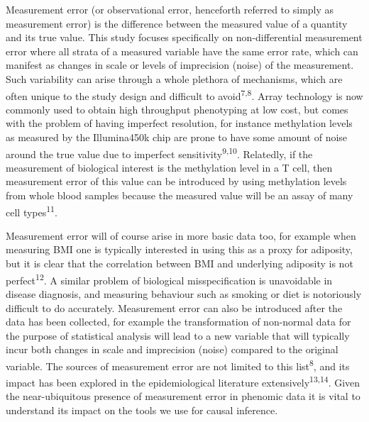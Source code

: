 \documentclass[]{article}
\begin{document}
Measurement error (or observational error, henceforth referred to simply
as measurement error) is the difference between the measured value of a
quantity and its true value. This study focuses specifically on
non-differential measurement error where all strata of a measured
variable have the same error rate, which can manifest as changes in
scale or levels of imprecision (noise) of the measurement. Such
variability can arise through a whole plethora of mechanisms, which are
often unique to the study design and difficult to
avoid\textsuperscript{7,8}. Array technology is now commonly used to
obtain high throughput phenotyping at low cost, but comes with the
problem of having imperfect resolution, for instance methylation levels
as measured by the Illumina450k chip are prone to have some amount of
noise around the true value due to imperfect
sensitivity\textsuperscript{9,10}. Relatedly, if the measurement of
biological interest is the methylation level in a T cell, then
measurement error of this value can be introduced by using methylation
levels from whole blood samples because the measured value will be an
assay of many cell types\textsuperscript{11}.

Measurement error will of course arise in more basic data too, for
example when measuring BMI one is typically interested in using this as
a proxy for adiposity, but it is clear that the correlation between BMI
and underlying adiposity is not perfect\textsuperscript{12}. A similar
problem of biological misspecification is unavoidable in disease
diagnosis, and measuring behaviour such as smoking or diet is
notoriously difficult to do accurately. Measurement error can also be
introduced after the data has been collected, for example the
transformation of non-normal data for the purpose of statistical
analysis will lead to a new variable that will typically incur both
changes in scale and imprecision (noise) compared to the original
variable. The sources of measurement error are not limited to this
list\textsuperscript{8}, and its impact has been explored in the
epidemiological literature extensively\textsuperscript{13,14}. Given the
near-ubiquitous presence of measurement error in phenomic data it is
vital to understand its impact on the tools we use for causal inference.
\end{document}
